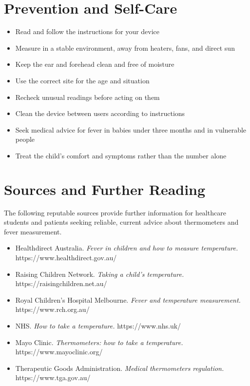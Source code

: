 \section*{Prevention and Self-Care}
\begin{itemize}
    \item Read and follow the instructions for your device
    \item Measure in a stable environment, away from heaters, fans, and direct sun
    \item Keep the ear and forehead clean and free of moisture
    \item Use the correct site for the age and situation
    \item Recheck unusual readings before acting on them
    \item Clean the device between users according to instructions
    \item Seek medical advice for fever in babies under three months and in vulnerable people
    \item Treat the child's comfort and symptoms rather than the number alone
\end{itemize}

\section*{Sources and Further Reading}
The following reputable sources provide further information for healthcare students and patients seeking reliable, current advice about thermometers and fever measurement.
\begin{itemize}
    \item Healthdirect Australia. \textit{Fever in children and how to measure temperature.} https://www.healthdirect.gov.au/
    \item Raising Children Network. \textit{Taking a child's temperature.} https://raisingchildren.net.au/
    \item Royal Children's Hospital Melbourne. \textit{Fever and temperature measurement.} https://www.rch.org.au/
    \item NHS. \textit{How to take a temperature.} https://www.nhs.uk/
    \item Mayo Clinic. \textit{Thermometers: how to take a temperature.} https://www.mayoclinic.org/
    \item Therapeutic Goods Administration. \textit{Medical thermometers regulation.} https://www.tga.gov.au/
\end{itemize}
